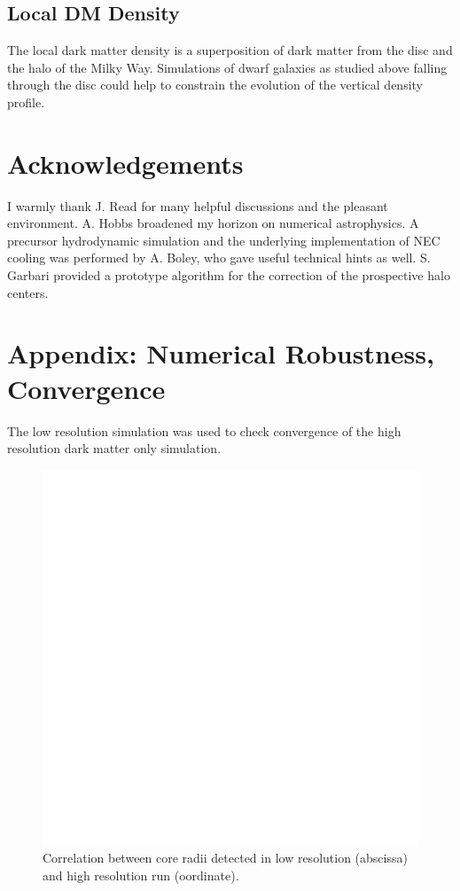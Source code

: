 \documentclass[useAMS,usenatbib]{mn2e}
\begin{document}
\subsection{Local DM Density}
The local dark matter density \cite{Garbari2010} is a superposition of
dark matter from the disc and the halo of the Milky Way. Simulations
of dwarf galaxies as studied above falling through the disc could help
to constrain the evolution of the vertical density profile.

\section*{Acknowledgements}
\label{sec:ack}

I warmly thank J. Read for many helpful discussions and the pleasant
environment. A. Hobbs broadened my horizon on numerical
astrophysics. A precursor hydrodynamic simulation and the underlying
implementation of NEC cooling was performed by A. Boley, who gave
useful technical hints as well. S. Garbari provided a prototype
algorithm for the correction of the prospective halo centers.

\section{Appendix: Numerical Robustness, Convergence}
\label{sec:app}
The low resolution simulation was used to check convergence of the
high resolution dark matter only simulation.

\begin{figure}
  \begin{center}
    \includegraphics[width=\textwidth]{fig/a.eps}%
  \end{center}
  \caption{\label{fig:corr_r_core}Correlation between core radii
    detected in low resolution (abscissa) and high resolution run
    (oordinate).}
\end{figure}
\end{document}

